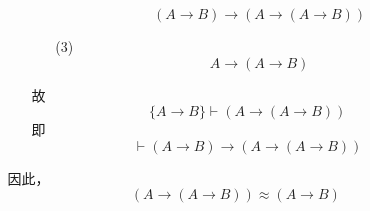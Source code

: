 \documentclass[11pt,oneside,a4paper]{article}
\begin{document}
\begin{itemize}
\begin{itemize}
\begin{itemize}
\begin{enumerate}
\begin{equation*}
                                    (A \to B) \to (A \to (A \to B)) \tag*{L1}
                                \end{equation*}
                        \item[(3)]
                                \begin{equation*}
                                    A \to (A \to B)                 \tag*{MP(1,2)}
                                \end{equation*}
                    \end{enumerate}
                    故\[\{ A \to B \}  \vdash  (A \to (A \to B)) \]
                    即\[ \vdash (A \to B) \to (A \to (A \to B))\]
                

            \end{itemize}
            因此，\[(A \to (A \to B)) \approx (A \to B)\]
        \end{itemize}
\end{itemize}
\end{document}
